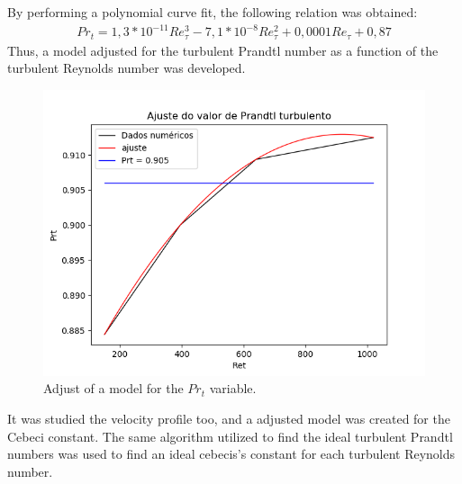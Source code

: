 \documentclass[10pt]{article} %
\begin{document}
By performing a polynomial curve fit, the following relation was obtained:
\begin{equation}
\begin{split}
Pr_t = 1,3 * 10^{-11} Re_\tau^3 - 7,1 * 10^{-8} Re_\tau^2 + 0,0001 Re_\tau + 0,87 
\end{split}
\end{equation}
Thus, a model adjusted for the turbulent Prandtl number as a function of the turbulent Reynolds number was developed.
	\begin{figure}[!h]
	\centering
	\includegraphics[angle=0, scale=0.295]{ajustePrandtl}
	\caption{Adjust of a model for the $ Pr_t $ variable.}
\end{figure}  


It was studied the velocity profile too, and a adjusted model was created for the Cebeci constant. The same algorithm utilized to find the ideal turbulent Prandtl numbers was used to find an ideal cebecis's constant for each turbulent Reynolds number. 
\end{document}
